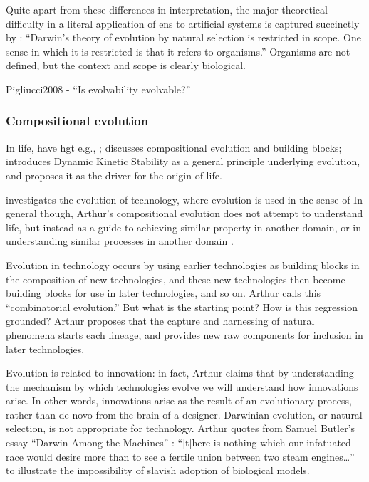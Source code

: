 Quite apart from these differences in interpretation, the major theoretical difficulty in a literal application of \gls{ens} to artificial systems is captured succinctly by \parencite{Griesemer2005}: ``Darwin's theory of evolution by natural selection is restricted in scope. One sense in which it is restricted is that it refers to organisms.'' Organisms are not defined, but the context and scope is clearly biological.

Pigliucci2008 - ``Is evolvability evolvable?''

\subsubsection{Compositional evolution}

In life, have \gls{hgt} e.g., \parencite{Ochman2000}; \parencite{Watson2002} discusses compositional evolution and building blocks; \parencite{Pross2011} introduces Dynamic Kinetic Stability as a general principle underlying evolution, and proposes it as the driver for the origin of life.

\parencite{Arthur2009} investigates the evolution of technology, where evolution is used in the sense of  In general though, Arthur's compositional evolution does not attempt to understand life, but instead as a guide to achieving similar property in another domain, or in understanding similar processes in another domain \parencite{Arthur2009}.

Evolution in technology occurs by using earlier technologies as building blocks in the composition of new technologies, and these new technologies then become building blocks for use in later
technologies, and so on. Arthur calls this ``combinatorial evolution.'' But what is the starting point? How is this regression grounded? Arthur proposes that the capture and harnessing of natural
phenomena starts each lineage, and provides new raw components for inclusion in later technologies.

Evolution is related to innovation: in fact, Arthur claims that by understanding the mechanism by which technologies evolve we will understand how innovations arise. In other words, innovations arise
as the result of an evolutionary process, rather than de novo from the brain of a designer. Darwinian evolution, or natural selection, is not appropriate for technology. Arthur quotes from Samuel Butler's essay ``Darwin Among the Machines'' : ``{[}t{]}here is nothing which our infatuated race would desire more than to see a fertile union between two steam engines\ldots{}'' to illustrate the impossibility of slavish adoption of biological models.

